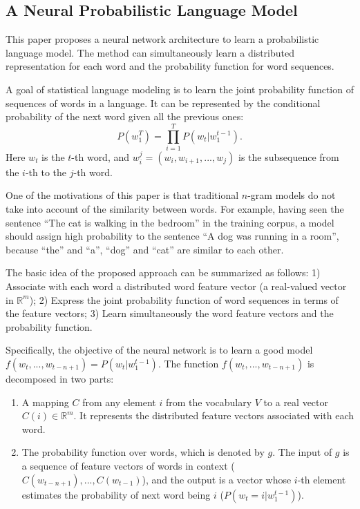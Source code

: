 \subsection{A Neural Probabilistic Language Model \cite{Bengio2003A}}

This paper proposes a neural network architecture to learn a probabilistic language model. The method can simultaneously learn a distributed representation for each word and the probability function for word sequences.

A goal of statistical language modeling is to learn the joint probability function of sequences of words in a language. It can be represented by the conditional probability of the next word given all the previous ones:
$$P(w_1^T) = \prod_{i=1}^T P(w_t | w_1^{t-1}).$$
Here $w_t$ is  the $t$-th word, and $w_i^j = (w_i, w_{i+1},... , w_j)$ is the subsequence from the $i$-th to the $j$-th word.

One of the motivations of this paper is that traditional $n$-gram models do not take into account of the similarity between words. For example, having seen the sentence ``The cat is walking in the bedroom'' in the training corpus, a model should assign high probability to the sentence ``A dog was running in a room'', because ``the'' and ``a'', ``dog'' and ``cat'' are similar to each other.

The basic idea of the proposed approach can be summarized as follows: 1) Associate with each word a distributed word feature vector (a real-valued vector in $\mathbb{R}^m$); 2) Express the joint probability function of word sequences in terms of the feature vectors; 3) Learn simultaneously the word feature vectors and the probability function.

Specifically, the objective of the neural network is to learn a good model $f(w_t, ..., w_{t-n+1}) = P(w_t | w_1^{t-1})$. The function $f(w_t, ..., w_{t-n+1})$ is decomposed in two parts:

\begin{enumerate}
\item A mapping $C$ from any element $i$ from the vocabulary $V$ to a real vector $C(i) \in \mathbb{R}^m$. It represents the distributed feature vectors associated with each word.
\item The probability function over words, which is denoted by $g$. The input of $g$ is a sequence of feature vectors of words in context ($C(w_{t-n+1}),..., C(w_{t-1})$), and the output is a vector whose $i$-th element estimates the probability of next word being $i$ ($P(w_t = i | w_1^{t-1})$).
\end{enumerate}

